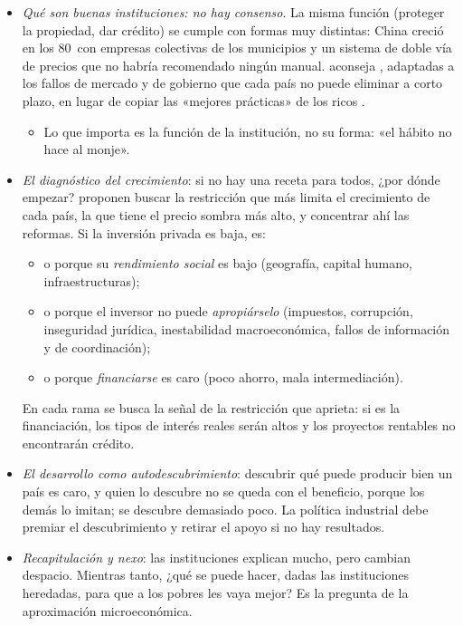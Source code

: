 \documentclass[11pt]{article}
\begin{document}
\begin{itemize}
\item \emph{Qué son buenas instituciones: no hay consenso}. La misma función (proteger la propiedad, dar crédito) se cumple con formas muy distintas: China creció en los 80~con empresas colectivas de los municipios y un sistema de doble vía de precios que no habría recomendado ningún manual. \textcite{Rodrik2008Second} aconseja , adaptadas a los fallos de mercado y de gobierno que cada país no puede eliminar a corto plazo, en lugar de copiar las «mejores prácticas» de los ricos .
  \begin{itemize}
  \item Lo que importa es la función de la institución, no su forma: «el hábito no hace al monje».
  \end{itemize}
\item \emph{El diagnóstico del crecimiento}: si no hay una receta para todos, ¿por dónde empezar? \textcite{HausmannRodrikVelasco2008} proponen buscar la restricción que más limita el crecimiento de cada país, la que tiene el precio sombra más alto, y concentrar ahí las reformas. Si la inversión privada es baja, es:
  \begin{itemize}
  \item o porque su \emph{rendimiento social} es bajo (geografía, capital humano, infraestructuras);
  \item o porque el inversor no puede \emph{apropiárselo} (impuestos, corrupción, inseguridad jurídica, inestabilidad macroeconómica, fallos de información y de coordinación);
  \item o porque \emph{financiarse} es caro (poco ahorro, mala intermediación).
  \end{itemize}
  En cada rama se busca la señal de la restricción que aprieta: si es la financiación, los tipos de interés reales serán altos y los proyectos rentables no encontrarán crédito.
\item \emph{El desarrollo como autodescubrimiento}: descubrir qué puede producir bien un país es caro, y quien lo descubre no se queda con el beneficio, porque los demás lo imitan; se descubre demasiado poco. La política industrial debe premiar el descubrimiento y retirar el apoyo si no hay resultados\nocite{HausmannRodrik2003,Rodrik2004Industrial}.
\item \emph{Recapitulación y nexo}: las instituciones explican mucho, pero cambian despacio. Mientras tanto, ¿qué se puede hacer, dadas las instituciones heredadas, para que a los pobres les vaya mejor? Es la pregunta de la aproximación microeconómica.
\end{itemize}
\end{document}

